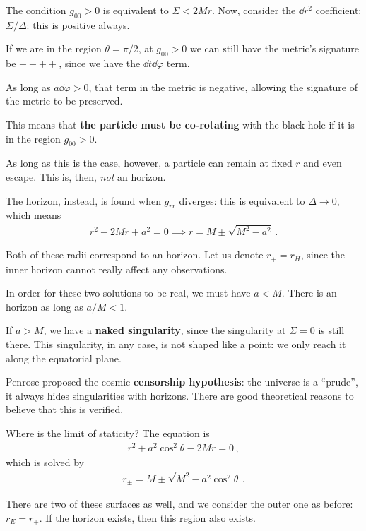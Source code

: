 \documentclass[main.tex]{subfiles}
\begin{document}
The condition \(g_{00} > 0\) is equivalent to \(\Sigma < 2Mr\).
Now, consider the \(\dd{r^2}\) coefficient: \(\Sigma / \Delta \): this is positive always. 

If we are in the region \(\theta = \pi /2\), at \(g_{00} > 0\) we can still have the metric's signature be \(- +++\), since we have the \(\dd{t} \dd{\varphi }\) term. 

As long as \(a \dd{\varphi } > 0\), that term in the metric is negative, allowing the signature of the metric to be preserved. 

This means that \textbf{the particle must be co-rotating} with the black hole if it is in the region \(g_{00} > 0\).
 
As long as this is the case, however, a particle can remain at fixed \(r\) and even escape. This is, then, \emph{not} an horizon. 

The horizon, instead, is found when \(g_{rr}\) diverges: this is equivalent to \(\Delta \to 0\), which means 
%
\begin{align}
r^2 - 2Mr + a^2 = 0 \implies r = M \pm \sqrt{M^2 - a^2}
\,.
\end{align}

Both of these radii correspond to an horizon. 
Let us denote \(r_+ = r_H\), since the inner horizon cannot really affect any observations. 

In order for these two solutions to be real, we must have \(a < M\). 
There is an horizon as long as \(a/ M < 1\). 

If \(a > M\), we have a \textbf{naked singularity}, since the singularity at \(\Sigma  = 0\) is still there.
This singularity, in any case, is not shaped like a point: we only reach it along the equatorial plane. 

Penrose proposed the cosmic \textbf{censorship hypothesis}: the universe is a ``prude'', it always hides singularities with horizons.
There are good theoretical reasons to believe that this is verified. 

Where is the limit of staticity? The equation is 
%
\begin{align}
r^2 + a^2 \cos^2 \theta - 2Mr = 0
\,,
\end{align}
%
which  is solved by 
%
\begin{align}
r_{\pm} = M \pm \sqrt{M^2- a^2 \cos^2 \theta }
\,.
\end{align}

There are two of these surfaces as well, and we consider the outer one as before: \(r_E = r_+\). If the horizon exists, then this region also exists. 
\end{document}
